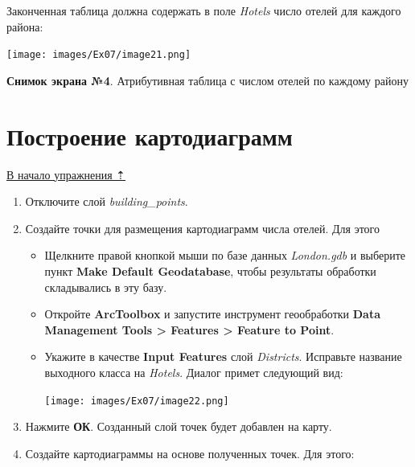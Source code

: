 \documentclass[12pt,]{book}
\begin{document}
Законченная таблица должна содержать в поле \emph{Hotels} число отелей для каждого района:

\texttt{[image: images/Ex07/image21.png]}

\textbf{Снимок экрана №4}. Атрибутивная таблица с числом отелей по каждому району

\hypertarget{map-ref-economic-diagrams}{%
\section{Построение картодиаграмм}\label{map-ref-economic-diagrams}}

\protect\hyperlink{map-ref-economic}{В начало упражнения ⇡}

\begin{enumerate}
\def\labelenumi{\arabic{enumi}.}
\item
  Отключите слой \emph{building\_points}.
\item
  Создайте точки для размещения картодиаграмм числа отелей. Для этого

  \begin{itemize}
  \item
    Щелкните правой кнопкой мыши по базе данных \emph{London.gdb} и выберите пункт \textbf{Make Default Geodatabase}, чтобы результаты обработки складывались в эту базу.
  \item
    Откройте \textbf{ArcToolbox} и запустите инструмент геообработки \textbf{Data Management Tools \textgreater{} Features \textgreater{} Feature to Point}.
  \item
    Укажите в качестве \textbf{Input Features} слой \emph{Districts}. Исправьте название выходного класса на \emph{Hotels}. Диалог примет следующий вид:

    \texttt{[image: images/Ex07/image22.png]}
  \end{itemize}
\item
  Нажмите \textbf{ОК}. Созданный слой точек будет добавлен на карту.
\item
  Создайте картодиаграммы на основе полученных точек. Для этого:


\end{enumerate}
\end{document}

